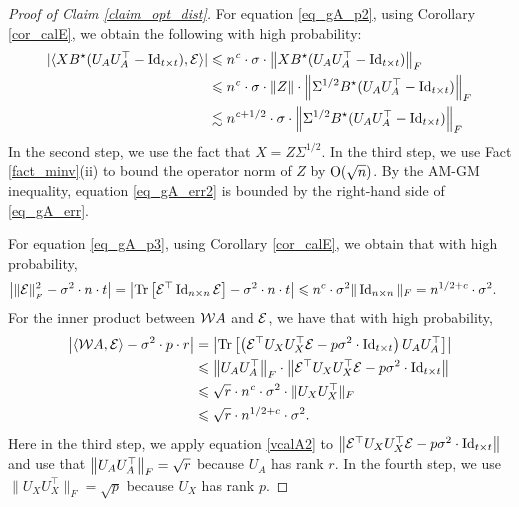 \begin{proof}[Proof of Claim \ref{claim_opt_dist}]
	For equation \eqref{eq_gA_p2}, 
	using Corollary \ref{cor_calE}, we obtain the following with high probability:
	\begin{align}
		|\langle XB^{\star} (U_AU_A^{\top} - \operatorname{Id}_{t\times t}), \mathcal{E} \rangle| &\leqslant n^{\mathit{c}} \cdot \sigma \cdot \left\| XB^{\star} (U_AU_A^{\top} - \operatorname{Id}_{t\times t}) \right\|_{F} \nonumber \\
		&\leqslant n^{{\mathit{c}}} \cdot \sigma \cdot \|Z\| \cdot \left\| \Sigma^{1/2} B^{\star}(U_AU_A^{\top} -\operatorname{Id}_{t\times t}) \right\|_{F} \nonumber \\
		&\lesssim n^{{\mathit{c}} + 1/2} \cdot \sigma \cdot \left\| \Sigma^{1/2} B^{\star}(U_AU_A^{\top} -\operatorname{Id}_{t\times t}) \right\|_{F} \label{eq_gA_err2}
	\end{align}
	In the second step, we use the fact that $X=Z\Sigma^{1/2}$.
	In the third step, we use Fact \ref{fact_minv}(ii) to bound the operator norm of $Z$ by $\operatorname{O}(\sqrt{n})$.
	By the AM-GM inequality, equation \eqref{eq_gA_err2} is bounded by the right-hand side of \eqref{eq_gA_err}.

	For equation \eqref{eq_gA_p3}, using Corollary \ref{cor_calE},
	we obtain that with high probability,
	\begin{align}
		\left\lvert\|\mathcal{E}\|_{_{F}}^2 - \sigma^2 \cdot n \cdot t\right\rvert=\left\lvert\operatorname{Tr}\left[ \mathcal E^\top \operatorname{Id}_{n\times n}\mathcal E\right] - \sigma^2 \cdot n \cdot t\right\rvert &\leqslant n^{c} \cdot \sigma^2 \| \operatorname{Id}_{n\times n}\|_F
		= n^{1/2+c} \cdot \sigma^2. \label{eq_gA_err3}
	\end{align}
	For the inner product between ${\mathcal W} A$ and $\mathcal{E}$, we have that with high probability,
	\begin{align}
		\bigabs{\inner{\cW A}{\cE} - \sigma^2\cdot p \cdot r } &= \bigabs{\bigtr{\left(\cE^\top U_X U_X^{\top}\cE  - p\sigma^2 \cdot  \id_{t\times t} \right)  U_AU_A^{\top} }} \nonumber  \\
		&\le \bignormFro{U_{A} U_A^{\top}} \cdot \bignorm{\cE^\top U_X U_X^{\top} \cE - p \sigma^2 \cdot  \id_{t\times t}} \nonumber \\
		&\le \sqrt{r} \cdot n^{\e}\cdot \sigma^2\cdot \|U_X U_X^\top\|_F \nonumber \\
		&\le \sqrt{r} \cdot n^{1/2+c} \cdot \sigma^2. \label{eq_gA_err4} %
	\end{align}
	Here in the third step, we apply equation \eqref{vcalA2} to $\left\| \mathcal{E}^\top U_X U_X^{\top} \mathcal{E} - p \sigma^2 \cdot  \operatorname{Id}_{t\times t} \right\|$ and use that $ \left\| U_{A} U_A^{\top} \right\|_{F}=\sqrt{r}$ because $U_A$ has rank $r$. In the fourth step, we use $\|U_X U_X^\top\|_F=\sqrt{p}$ because $U_X$ has rank $p$.


\end{proof}
